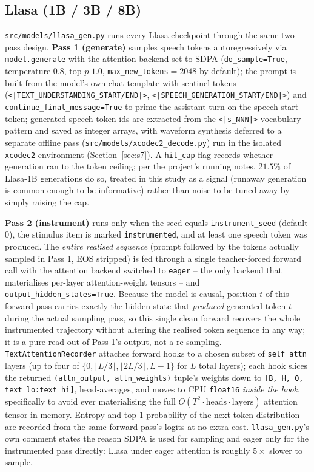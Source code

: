 \documentclass[11pt]{article}
\begin{document}
\subsection{Llasa (1B / 3B / 8B)}

\texttt{src/models/llasa\_gen.py} runs every Llasa checkpoint through the
same two-pass design. \textbf{Pass 1 (generate)} samples speech tokens
autoregressively via \texttt{model.generate} with the attention backend set
to SDPA (\texttt{do\_sample=True}, temperature $0.8$, top-$p$ $1.0$,
\texttt{max\_new\_tokens}$=2048$ by default); the prompt is built from the
model's own chat template with sentinel tokens
(\texttt{<|TEXT\_UNDERSTANDING\_START/END|>},
\texttt{<|SPEECH\_GENERATION\_START/END|>}) and
\texttt{continue\_final\_message=True} to prime the assistant turn on the
speech-start token; generated speech-token ids are extracted from the
\texttt{<|s\_NNN|>} vocabulary pattern and saved as integer arrays, with
waveform synthesis deferred to a separate offline pass
(\texttt{src/models/xcodec2\_decode.py}) run in the isolated
\texttt{xcodec2} environment (Section~\ref{sec:s7}). A \texttt{hit\_cap} flag
records whether generation ran to the token ceiling; per the project's
running notes, $21.5\%$ of Llasa-1B generations do so, treated in this study
as a signal (runaway generation is common enough to be informative) rather
than noise to be tuned away by simply raising the cap.

\textbf{Pass 2 (instrument)} runs only when the seed equals
\texttt{instrument\_seed} (default $0$), the stimulus item is marked
\texttt{instrumented}, and at least one speech token was produced. The
\emph{entire realised sequence} (prompt followed by the tokens actually
sampled in Pass 1, EOS stripped) is fed through a single teacher-forced
forward call with the attention backend switched to \texttt{eager} -- the
only backend that materialises per-layer attention-weight tensors -- and
\texttt{output\_hidden\_states=True}. Because the model is causal, position
$t$ of this forward pass carries exactly the hidden state that \emph{produced}
generated token $t$ during the actual sampling pass, so this single clean
forward recovers the whole instrumented trajectory without altering the
realised token sequence in any way; it is a pure read-out of Pass 1's output,
not a re-sampling. \texttt{TextAttentionRecorder} attaches forward hooks to a
chosen subset of \texttt{self\_attn} layers (up to four of
$\{0, \lfloor L/3\rfloor, \lfloor 2L/3\rfloor, L-1\}$ for $L$ total layers);
each hook slices the returned \texttt{(attn\_output, attn\_weights)} tuple's
weights down to \texttt{[B, H, Q, text\_lo:text\_hi]}, head-averages, and
moves to CPU \texttt{float16} \emph{inside the hook}, specifically to avoid
ever materialising the full $O(T^2\cdot\text{heads}\cdot\text{layers})$
attention tensor in memory. Entropy and top-1 probability of the next-token
distribution are recorded from the same forward pass's logits at no extra
cost. \texttt{llasa\_gen.py}'s own comment states the reason SDPA is used for
sampling and eager only for the instrumented pass directly: Llasa under
eager attention is roughly $5\times$ slower to sample.
\end{document}
